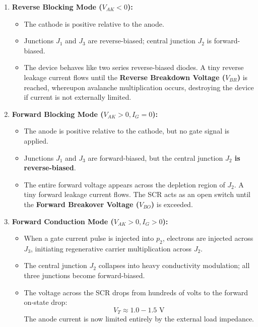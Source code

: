 \documentclass[11pt,a4paper]{article}
\begin{document}
\begin{enumerate}[leftmargin=*]
  \item \textbf{Reverse Blocking Mode ($V_{AK} < 0$):}
    \begin{itemize}
      \item The cathode is positive relative to the anode.
      \item Junctions $J_1$ and $J_3$ are reverse-biased; central junction $J_2$ is forward-biased.
      \item The device behaves like two series reverse-biased diodes. A tiny reverse leakage current flows until the \textbf{Reverse Breakdown Voltage ($V_{BR}$)} is reached, whereupon avalanche multiplication occurs, destroying the device if current is not externally limited.
    \end{itemize}
  \item \textbf{Forward Blocking Mode ($V_{AK} > 0, I_G = 0$):}
    \begin{itemize}
      \item The anode is positive relative to the cathode, but no gate signal is applied.
      \item Junctions $J_1$ and $J_3$ are forward-biased, but the central junction \textbf{$J_2$ is reverse-biased}.
      \item The entire forward voltage appears across the depletion region of $J_2$. A tiny forward leakage current flows. The SCR acts as an open switch until the \textbf{Forward Breakover Voltage ($V_{BO}$)} is exceeded.
    \end{itemize}
  \item \textbf{Forward Conduction Mode ($V_{AK} > 0, I_G > 0$):}
    \begin{itemize}
      \item When a gate current pulse is injected into $p_2$, electrons are injected across $J_3$, initiating regenerative carrier multiplication across $J_2$.
      \item The central junction $J_2$ collapses into heavy conductivity modulation; all three junctions become forward-biased.
      \item The voltage across the SCR drops from hundreds of volts to the forward on-state drop:
      \begin{equation}
      V_T \approx 1.0 - 1.5\text{ V}
      \end{equation}
      The anode current is now limited entirely by the external load impedance.
    \end{itemize}
\end{enumerate}
\end{document}
